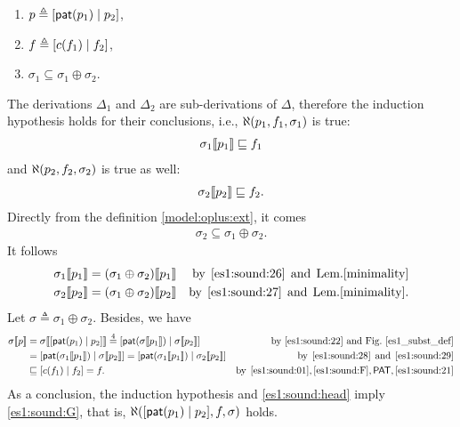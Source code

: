 \begin{enumerate}
\begin{enumerate}
      \item \label{es1:sound:22} \(p \triangleq
        \cons{\pat{p_1}}{p_2}\),

      \item \label{es1:sound:21} \(f \triangleq \cons{c(f_1)}{f_2}\),

      \item \label{es1:sound:26} \(\sigma_1 \subseteq \sigma_1 \oplus
        \sigma_2\).
          
    \end{enumerate}
    The derivations \(\Delta_1\) and \(\Delta_2\) are
    sub\hyp{}derivations of \(\Delta\), therefore the induction
    hypothesis holds for their conclusions, i.e.,
    \(\ind{U}(p_1, f_1, \sigma_1)\) is true:
    \begin{gather}
      \subst{p_1}{\sigma_1} \sqsubseteq f_1 \label{es1:sound:01}
    \end{gather}
    and \(\ind{U}(p_2, f_2, \sigma_2)\) is true as well:
    \begin{gather}
      \subst{p_2}{\sigma_2} \sqsubseteq f_2. \label{es1:sound:F}
    \end{gather}
    Directly from the definition \eqref{model:oplus:ext}, it comes
    \begin{gather}
      \sigma_2 \subseteq \sigma_1 \oplus \sigma_2. \label{es1:sound:27}
    \end{gather}
    It follows
    \begin{align}
       \subst{p_1}{\sigma_1}
      &= \subst{p_1}{(\sigma_1 \oplus \sigma_2)}
      &\text{by} \,\; \text{\ref{es1:sound:26}} \,\; \text{and} \,\;
        \text{Lem.\ref{minimality}}\label{es1:sound:28}\\
        \subst{p_2}{\sigma_2}
      &= \subst{p_2}{(\sigma_1 \oplus \sigma_2)}
      &\text{by} \,\; \eqref{es1:sound:27} \,\; \text{and} \,\;
        \text{Lem.\ref{minimality}}.\label{es1:sound:29}
    \end{align}
    Let \(\sigma \triangleq \sigma_1 \oplus \sigma_2\). Besides, we
    have
    \begin{align}
         \subst{p}{\sigma}
      &= \subst{\cons{\pat{p_1}}{p_2}}{\sigma}
      \eqn{4}
       \cons{\pat{\subst{p_1}{\sigma}}}%
            {\subst{p_2}{\sigma}}
      &\text{by~\ref{es1:sound:22} and
              Fig.~\ref{es1_subst_def}}\notag\\
      &= \cons{\pat{\subst{p_1}{\sigma_1}}}%
              {\subst{p_2}{\sigma}}
      = \cons{\pat{\subst{p_1}{\sigma_1}}}%
              {\subst{p_2}{\sigma_2}}
      &\text{by} \,\; \eqref{es1:sound:28} 
       \,\; \text{and} \,\; \eqref{es1:sound:29}\notag\\
      &\sqsubseteq \cons{c(f_1)}{f_2} = f.
      &\text{by} \,\; \eqref{es1:sound:01}, \eqref{es1:sound:F},
       \textsf{PAT}, \text{\ref{es1:sound:21}}\label{es1:sound:G}
    \end{align}
    As a conclusion, the induction hypothesis and
    \eqref{es1:sound:head} imply \eqref{es1:sound:G},
    that is, \(\ind{U}(\cons{\pat{p_1}}{p_2}, f,
    \sigma)\) holds.


\end{enumerate}
